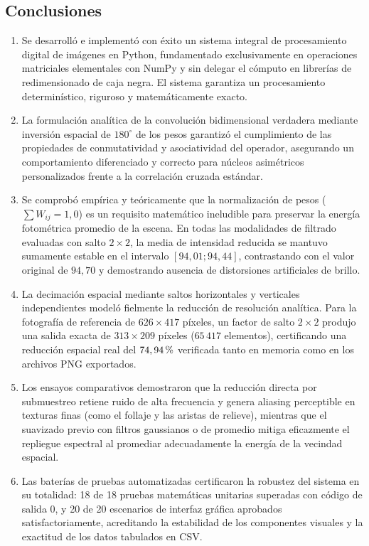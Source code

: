 \documentclass[11pt]{article}
\newcommand{\pct}{\ensuremath{\mathrm{\char37}}}
\begin{document}
\subsection{Conclusiones}
\begin{enumerate}[itemsep=0.3em]
\item Se desarrolló e implementó con éxito un sistema integral de procesamiento digital de imágenes en Python, fundamentado exclusivamente en operaciones matriciales elementales con NumPy y sin delegar el cómputo en librerías de redimensionado de caja negra. El sistema garantiza un procesamiento determinístico, riguroso y matemáticamente exacto.
\item La formulación analítica de la convolución bidimensional verdadera mediante inversión espacial de $180^\circ$ de los pesos garantizó el cumplimiento de las propiedades de conmutatividad y asociatividad del operador, asegurando un comportamiento diferenciado y correcto para núcleos asimétricos personalizados frente a la correlación cruzada estándar.
\item Se comprobó empírica y teóricamente que la normalización de pesos ($\sum W_{ij} = 1,0$) es un requisito matemático ineludible para preservar la energía fotométrica promedio de la escena. En todas las modalidades de filtrado evaluadas con salto $2\times2$, la media de intensidad reducida se mantuvo sumamente estable en el intervalo $[94,01; 94,44]$, contrastando con el valor original de $94,70$ y demostrando ausencia de distorsiones artificiales de brillo.
\item La decimación espacial mediante saltos horizontales y verticales independientes modeló fielmente la reducción de resolución analítica. Para la fotografía de referencia de $626 \times 417$ píxeles, un factor de salto $2\times2$ produjo una salida exacta de $313 \times 209$ píxeles ($65\,417$ elementos), certificando una reducción espacial real del $74,94\,\pct$ verificada tanto en memoria como en los archivos PNG exportados.
\item Los ensayos comparativos demostraron que la reducción directa por submuestreo retiene ruido de alta frecuencia y genera aliasing perceptible en texturas finas (como el follaje y las aristas de relieve), mientras que el suavizado previo con filtros gaussianos o de promedio mitiga eficazmente el repliegue espectral al promediar adecuadamente la energía de la vecindad espacial.
\item Las baterías de pruebas automatizadas certificaron la robustez del sistema en su totalidad: 18 de 18 pruebas matemáticas unitarias superadas con código de salida 0, y 20 de 20 escenarios de interfaz gráfica aprobados satisfactoriamente, acreditando la estabilidad de los componentes visuales y la exactitud de los datos tabulados en CSV.
\end{enumerate}
\end{document}
